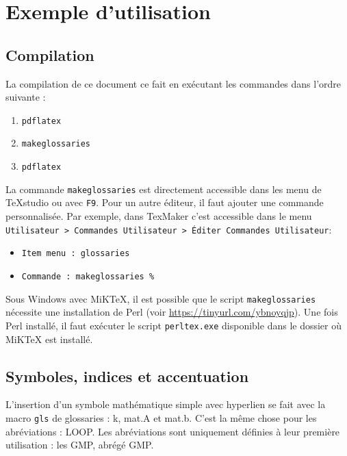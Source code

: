 \documentclass[PhD,nohyperref,english,french]{ulthese}
\begin{document}
\frontmatter                    %

\pagetitre

\begin{SingleSpace}
\abnormalparskip{0pt}
\printglossary[title=Nomenclature]
\end{SingleSpace}


\mainmatter                     %

\chapter{Exemple d'utilisation}

\section{Compilation}
La compilation de ce document ce fait en exécutant les commandes dans l'ordre suivante :
\begin{enumerate}
	\item \texttt{pdflatex}
	\item \texttt{makeglossaries}
	\item \texttt{pdflatex}
\end{enumerate}
La commande \texttt{makeglossaries} est directement accessible dans les menu de TeXstudio ou avec \texttt{F9}. Pour un autre éditeur, il faut ajouter une commande personnalisée. Par exemple, dans TexMaker c’est accessible dans le menu \texttt{Utilisateur > Commandes Utilisateur > Éditer Commandes Utilisateur}:
\begin{itemize}
	\item \texttt{Item menu : glossaries} 
	\item \texttt{Commande : makeglossaries \%}
\end{itemize}
Sous Windows avec MiKTeX, il est possible que le script \texttt{makeglossaries} nécessite une installation de Perl (voir \url{https://tinyurl.com/ybnoyqjp}). Une fois Perl installé, il faut exécuter le script \texttt{perltex.exe} disponible dans le dossier où MiKTeX est installé.

\section{Symboles, indices et accentuation}
L'insertion d'un symbole mathématique simple avec hyperlien se fait avec la macro \texttt{gls} de glossaries : \gls{k}, \gls{mat.A} et \gls{mat.b}. C'est la même chose pour les abréviations : \gls{LOOP}. Les abréviations sont uniquement définies à leur première utilisation : les \gls{GMP}, abrégé \gls{GMP}.
\end{document}
